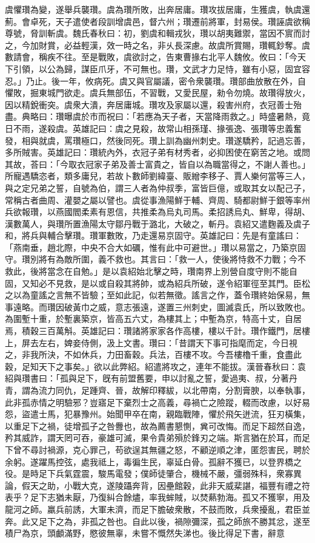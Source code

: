\begin{pinyinscope}
虞懼瓚為變，遂舉兵襲瓚。虞為瓚所敗，出奔居庸。瓚攻拔居庸，生獲虞，執虞還薊。會卓死，天子遣使者段訓增虞邑，督六州；瓚遷前將軍，封易侯。瓚誣虞欲稱尊號，脅訓斬虞。魏氏春秋曰：初，劉虞和輯戎狄，瓚以胡夷難禦，當因不賔而討之，今加財賞，必益輕漢，效一時之名，非乆長深慮。故虞所賞賜，瓚輒鈔奪。虞數請會，稱疾不往。至是戰敗，虞欲討之，告東曹掾右北平人魏攸。攸曰：「今天下引領，以公為歸，謀臣爪牙，不可無也。瓚，文武才力足恃，雖有小惡，固宜容忍。」乃止。後一年，攸病死。虞又與官屬議，密令衆襲瓚。瓚部曲放散在外，自懼敗，掘東城門欲走。虞兵無部伍，不習戰，又愛民屋，勑令勿燒。故瓚得放火，因以精銳衝突。虞衆大潰，奔居庸城。瓚攻及家屬以還，殺害州府，衣冠善士殆盡。典略曰：瓚曝虞於市而祝曰：「若應為天子者，天當降雨救之。」時盛暑熱，竟日不雨，遂殺虞。英雄記曰：虞之見殺，故常山相孫瑾、掾張逸、張瓚等忠義奮發，相與就虞，罵瓚極口，然後同死。瓚上訓為幽州刺史。瓚遂驕矜，記過忘善，多所賊害。英雄記曰：瓚統內外，衣冠子弟有材秀者，必抑困使在窮苦之地。或問其故，荅曰：「今取衣冠家子弟及善士富貴之，皆自以為職當得之，不謝人善也。」所寵遇驕恣者，類多庸兒，若故卜數師劉緯臺、販繒李移子、賈人樂何當等三人，與之定兄弟之誓，自號為伯，謂三人者為仲叔季，富皆巨億，或取其女以配己子，常稱古者曲周、灌嬰之屬以譬也。虞從事漁陽鮮于輔、齊周、騎都尉鮮于銀等率州兵欲報瓚，以燕國閻柔素有恩信，共推柔為烏丸司馬。柔招誘烏丸、鮮卑，得胡、漢數萬人，與瓚所置漁陽太守鄒丹戰于潞北，大破之，斬丹。袁紹又遣麴義及虞子和，將兵與輔合擊瓚。瓚軍數敗，乃走還易京固守。英雄記曰：先是有童謠曰：「燕南垂，趙北際，中央不合大如礪，惟有此中可避世。」瓚以易當之，乃築京固守。瓚別將有為敵所圍，義不救也。其言曰：「救一人，使後將恃救不力戰；今不救此，後將當念在自勉。」是以袁紹始北擊之時，瓚南界上別營自度守則不能自固，又知必不見救，是以或自殺其將帥，或為紹兵所破，遂令紹軍徑至其門。臣松之以為童謠之言無不皆驗；至如此記，似若無徵。謠言之作，蓋令瓚終始保易，無事遠略。而瓚因破黃巾之威，意志張遠，遂置三州刺史，圖滅袁氏，所以致敗也。為圍塹十重，於塹裏築京，皆高五六丈，為樓其上；中塹為京，特高十丈，自居焉，積穀三百萬斛。英雄記曰：瓚諸將家家各作高樓，樓以千計。瓚作鐵門，居樓上，屏去左右，婢妾侍側，汲上文書。瓚曰：「昔謂天下事可指麾而定，今日視之，非我所決，不如休兵，力田畜穀。兵法，百樓不攻。今吾樓櫓千重，食盡此穀，足知天下之事矣。」欲以此弊紹。紹遣將攻之，連年不能拔。漢晉春秋曰：袁紹與瓚書曰：「孤與足下，旣有前盟舊要，申以討亂之誓，愛過夷、叔，分著丹青，謂為流力同仇，足踵齊、晉，故解印釋紱，以北帶南，分割膏腴，以奉執事，此非孤赤情之明驗邪？豈寤足下棄烈士之高義，尋禍亡之險蹤，輟而改慮，以好易怨，盜遣士馬，犯暴豫州。始聞甲卒在南，親臨戰陣，懼於飛矢迸流，狂刃橫集，以重足下之禍，徒增孤子之咎釁也，故為薦書懇惻，兾可改悔。而足下超然自逸，矜其威詐，謂天罔可吞，豪雄可滅，果令貴弟殞於鋒刃之端。斯言猶在於耳，而足下曾不尋討禍源，克心罪己，苟欲逞其無疆之怒，不顧逆順之津，匿怨害民，聘於余躬。遂躍馬控弦，處我祗上，毒徧生民，辜延白骨。孤辭不獲已，以登界橋之役。是時足下兵氣霆震，駿馬電發；僕師徒肇合，機械不嚴，彊弱殊科，衆寡異論，假天之助，小戰大克，遂陵躡奔背，因壘館穀，此非天威棐諶，福豐有禮之符表乎？足下志猶未厭，乃復糾合餘燼，率我蛑賊，以焚爇勃海。孤又不獲寧，用及龍河之師。羸兵前誘，大軍未濟，而足下膽破衆散，不鼓而敗，兵衆擾亂，君臣並奔。此又足下之為，非孤之咎也。自此以後，禍隙彌深，孤之師旅不勝其忿，遂至積尸為京，頭顱滿野，愍彼無辜，未嘗不慨然失涕也。後比得足下書，辭意
\end{pinyinscope}
